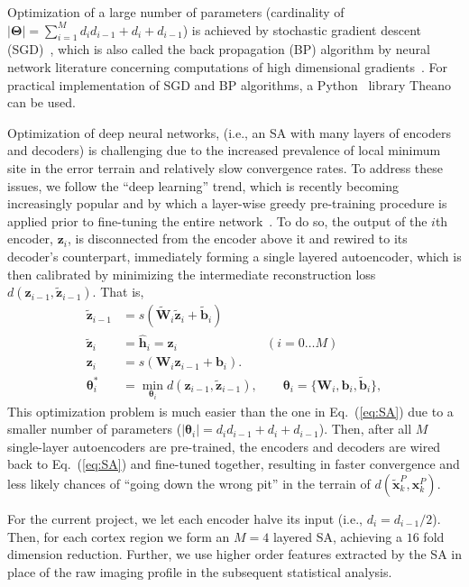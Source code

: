 \documentclass[11pt]{article}
\newcommand{\vecEC}[1]{\boldsymbol{#1}}
\newcommand{\vecDC}[1]{\boldsymbol{\tilde{#1}}}
\newcommand{\WEC}{\vecEC{W}}                   %
\newcommand{\WDC}{\vecDC{W}}                   %
\newcommand{\bEC}{\vecEC{b}}    %
\newcommand{\bDC}{\vecDC{b}}    %
\newcommand{\xEC}{\vecEC{x}}
\newcommand{\xDC}{\vecDC{x}}
\newcommand{\hHT}{\boldsymbol{\hat{h}}}
\newcommand{\zEC}{\vecEC{z}}
\newcommand{\zDC}{\vecDC{z}}
\newcommand{\Par}{\boldsymbol{\Theta}}
\newcommand{\pEC}{\boldsymbol{\theta}}
\begin{document}
Optimization of a large number of parameters (cardinality of $|\Par| = \sum_{i=1}^M{d_i d_{i-1} + d_i + d_{i-1}}$) is achieved by stochastic gradient descent (SGD)~\citep{SGD1, SGD2}, which is also called the back propagation (BP) algorithm by neural network literature concerning computations of high dimensional gradients~\citep{BP1, BP2, BP3}. For practical implementation of SGD and BP algorithms, a Python~\citep{python1} library Theano~\citep{Theano1} can be used.

Optimization of deep neural networks, (i.e., an SA with many layers of encoders and decoders) is challenging due to the increased prevalence of local minimum site in the error terrain and relatively slow convergence rates. To address these issues, we follow the ``deep learning'' trend, which is recently becoming increasingly popular and by which a layer-wise greedy pre-training procedure is applied prior to fine-tuning the entire network~\citep{DL:DBN1, DL:SDA1}. To do so, the output of the $i$th encoder, $\zEC_i$, is disconnected from the encoder above it and rewired to its decoder's counterpart, immediately forming a single layered autoencoder, which is then calibrated by minimizing the intermediate reconstruction loss $d(\zEC_{i-1}, \zDC_{i-1})$. That is,
\begin{equation}\label{eq:Greedy}
  \begin{split}
    \zDC_{i-1} &= s(\WDC_i \zDC_i + \bDC_i) \\
    \zDC_{i  } &= \hHT_i = \zEC_i \quad \qquad \qquad \qquad (i = 0 \dots M) \\
    \zEC_{i  } &= s(\WEC_i\zEC_{i-1} + \bEC_i). \\
    \pEC_i^* &= \min_{\pEC_i}{d(\zEC_{i-1}, \zDC_{i-1})}, \qquad \pEC_i = \{\WEC_i, \bEC_i, \bDC_i\},
  \end{split}
\end{equation}
This optimization problem is much easier than the one in Eq.~(\ref{eq:SA}) due to a smaller number of parameters ($|\pEC_i|=d_i d_{i-1} + d_i + d_{i-1}$). Then, after all $M$ single-layer autoencoders are pre-trained, the encoders and decoders are wired back to Eq.~(\ref{eq:SA}) and fine-tuned together, resulting in faster convergence and less likely chances of ``going down the wrong pit'' in the terrain of $d(\xDC_k^P, \xEC_k^P)$.

For the current project, we let each encoder halve its input (i.e., $d_i = d_{i-1}/2$). Then, for each cortex region we form an $M=4$ layered SA, achieving a $16$ fold dimension reduction. Further, we use higher order features extracted by the SA in place of the raw imaging profile in the subsequent statistical analysis.
\end{document}
